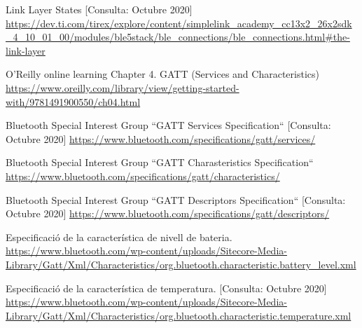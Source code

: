 \begin{thebibliography}{2}
Link Layer States [Consulta: Octubre 2020]\newline
\href{https://dev.ti.com/tirex/explore/content/simplelink_academy_cc13x2_26x2sdk_4_10_01_00/modules/ble5stack/ble_connections/ble_connections.html\#the-link-layer}{https://dev.ti.com/tirex/explore/content/simplelink\_academy\_cc13x2\_26x2sdk\_4\_10\_01\_00/modules/ble5stack/ble\_connections/ble\_connections.html\#the-link-layer}

O’Reilly online learning
Chapter 4. GATT (Services and Characteristics)  \newline
\href{https://www.oreilly.com/library/view/getting-started-with/9781491900550/ch04.html}{https://www.oreilly.com/library/view/getting-started-with/9781491900550/ch04.html}

Bluetooth Special Interest Group
``GATT Services Specification``
[Consulta: Octubre 2020]\newline
\href{https://www.bluetooth.com/specifications/gatt/services/}{https://www.bluetooth.com/specifications/gatt/services/}

Bluetooth Special Interest Group ``GATT Charasteristics Specification``\newline
\href{https://www.bluetooth.com/specifications/gatt/characteristics/}{https://www.bluetooth.com/specifications/gatt/characteristics/}

Bluetooth Special Interest Group
``GATT Descriptors Specification``
[Consulta: Octubre 2020]\newline
\href{https://www.bluetooth.com/specifications/gatt/descriptors/}{https://www.bluetooth.com/specifications/gatt/descriptors/}

Especificació de la característica de nivell de bateria.\newline
\href{https://www.bluetooth.com/wp-content/uploads/Sitecore-Media-Library/Gatt/Xml/Characteristics/org.bluetooth.characteristic.battery\_level.xml}{https://www.bluetooth.com/wp-content/uploads/Sitecore-Media-Library/Gatt/Xml/Characteristics/org.bluetooth.characteristic.battery\_level.xml}

Especificació de la característica de temperatura.
[Consulta: Octubre 2020] \newline
\href{https://www.bluetooth.com/wp-content/uploads/Sitecore-Media-Library/Gatt/Xml/Characteristics/org.bluetooth.characteristic.temperature.xml}{https://www.bluetooth.com/wp-content/uploads/Sitecore-Media-Library/Gatt/Xml/Characteristics/org.bluetooth.characteristic.temperature.xml}


\end{thebibliography}
